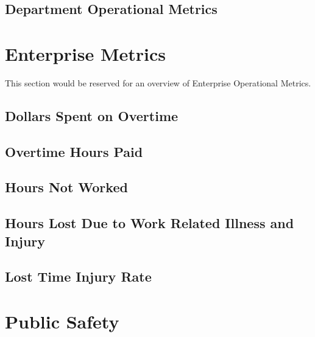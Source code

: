 \documentclass[]{book}
\begin{document}
\hypertarget{department-operational-metrics}{%
\section*{Department Operational Metrics}\label{department-operational-metrics}}

\hypertarget{eoms}{%
\chapter{Enterprise Metrics}\label{eoms}}

This section would be reserved for an overview of Enterprise Operational Metrics.

\hypertarget{dollars-spent-on-overtime}{%
\section{Dollars Spent on Overtime}\label{dollars-spent-on-overtime}}

\hypertarget{overtime-hours-paid}{%
\section{Overtime Hours Paid}\label{overtime-hours-paid}}

\hypertarget{hours-not-worked}{%
\section{Hours Not Worked}\label{hours-not-worked}}

\hypertarget{hours-lost-due-to-work-related-illness-and-injury}{%
\section{Hours Lost Due to Work Related Illness and Injury}\label{hours-lost-due-to-work-related-illness-and-injury}}

\hypertarget{lost-time-injury-rate}{%
\section{Lost Time Injury Rate}\label{lost-time-injury-rate}}

\hypertarget{public-safety}{%
\chapter*{Public Safety}\label{public-safety}}
\end{document}
